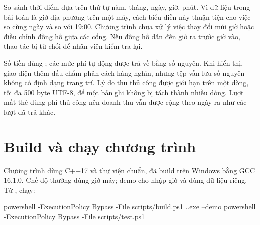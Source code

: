 
So sánh thời điểm dựa trên thứ tự năm, tháng, ngày, giờ, phút. Vì dữ liệu trong bài toán là giờ địa phương trên một máy, cách biểu diễn này thuận tiện cho việc so cùng ngày và so với 19:00. Chương trình chưa xử lý việc thay đổi múi giờ hoặc điều chỉnh đồng hồ giữa các cổng. Nếu đồng hồ dẫn đến giờ ra trước giờ vào, thao tác bị từ chối để nhân viên kiểm tra lại.

Số tiền dùng ; các mức phí tự động được trả về bằng số nguyên. Khi hiển thị, giao diện thêm dấu chấm phân cách hàng nghìn, nhưng tệp vẫn lưu số nguyên không có định dạng trang trí. Lý do thu thủ công được giới hạn trên một dòng, tối đa 500 byte UTF-8, để một bản ghi không bị tách thành nhiều dòng. Lượt mất thẻ dùng phí thủ công nên doanh thu vẫn được cộng theo ngày ra như các lượt đã trả khác.

\section{Build và chạy chương trình}
Chương trình dùng C++17 và thư viện chuẩn, đã build trên Windows bằng GCC 16.1.0. Chế độ thường dùng giờ máy; demo cho nhập giờ và dùng dữ liệu riêng. Từ , chạy:

\begin{Code}
powershell -ExecutionPolicy Bypass -File scripts/build.ps1
.\build\parking.exe --demo
powershell -ExecutionPolicy Bypass -File scripts/test.ps1
\end{Code}

